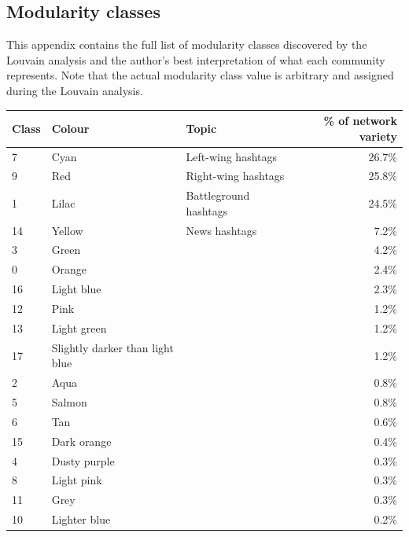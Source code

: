 \documentclass[a4paper,11pt]{article}  %
\begin{document}
\begin{appendices}
	\section{Modularity classes}
	\label{app:modularities}
	This appendix contains the full list of modularity classes discovered by the Louvain analysis and the author's best interpretation of what each community represents. Note that the actual modularity class value is arbitrary and assigned during the Louvain analysis.
	\begin{center}
		\begin{tabular}{||l l l r||} 
			\hline
			Class & Colour & Topic & \% of network variety \\ [0.5ex] 
			\hline\hline
			7 & Cyan & Left-wing hashtags & 26.7\% \\ 
			\hline
			9 & Red & Right-wing hashtags & 25.8\% \\
			\hline
			1 & Lilac & Battleground hashtags & 24.5\% \\
			\hline
			14 & Yellow & News hashtags & 7.2\% \\
			\hline
			3 & Green &  & 4.2\% \\
			\hline
			0 & Orange &  & 2.4\% \\
			\hline
			16 & Light blue &  & 2.3\% \\
			\hline
			12 & Pink &  & 1.2\% \\
			\hline
			13 & Light green &  & 1.2\% \\
			\hline
			17 & Slightly darker than light blue &  & 1.2\% \\
			\hline
			2 & Aqua &  & 0.8\% \\
			\hline
			5 & Salmon &  & 0.8\% \\
			\hline
			6 & Tan &  & 0.6\% \\
			\hline
			15 & Dark orange &  & 0.4\% \\
			\hline
			4 & Dusty purple &  & 0.3\% \\
			\hline
			8 & Light pink &  & 0.3\% \\
			\hline
			11 & Grey &  & 0.3\% \\
			\hline
			10 & Lighter blue &  & 0.2\% \\
			\hline
		\end{tabular}
	\end{center}
	
	\end{appendices}
	
	\newpage
	\label{sec:references}
	\printbibliography
	
\end{document}
